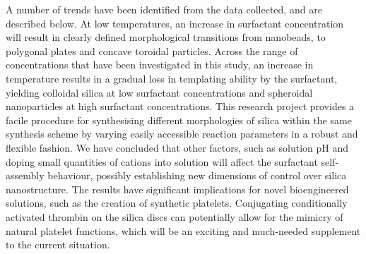 \documentclass[a4paper,12pt]{article}
\begin{document}
	\bigbreak
	A number of trends have been identified from the data collected, and are described below. At low temperatures, an increase in surfactant concentration will result in clearly defined morphological transitions from nanobeads, to polygonal plates and concave toroidal particles. Across the range of concentrations that have been investigated in this study, an increase in temperature results in a gradual loss in templating ability by the surfactant, yielding colloidal silica at low surfactant concentrations and spheroidal nanoparticles at high surfactant concentrations.
	\bigbreak
	This research project provides a facile procedure for synthesising different morphologies of silica within the same synthesis scheme by varying easily accessible reaction parameters in a robust and flexible fashion. We have concluded that other factors, such as solution pH and doping small quantities of cations into solution will affect the surfactant self-assembly behaviour, possibly establishing new dimensions of control over silica nanostructure. The results have significant implications for novel bioengineered solutions, such as the creation of synthetic platelets. Conjugating conditionally activated thrombin on the silica discs can potentially allow for the mimicry of natural platelet functions, which will be an exciting and much-needed supplement to the current situation.
		
	 
	
\end{document}
